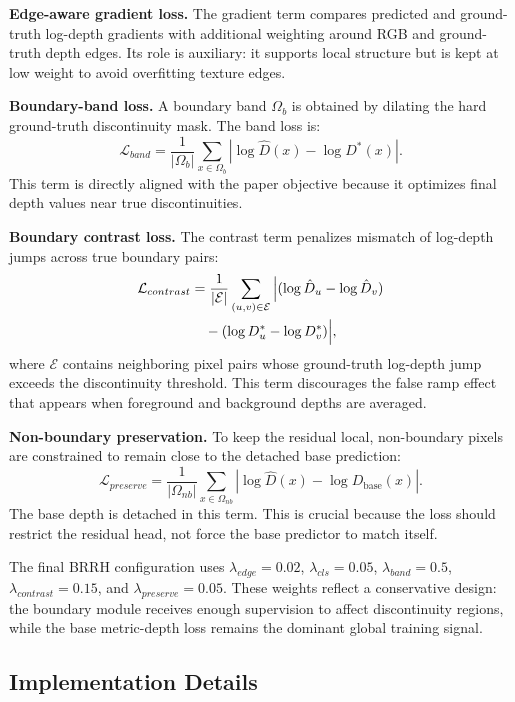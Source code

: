 \documentclass{ieeeaccess}
\begin{document}
\textbf{Edge-aware gradient loss.}
The gradient term compares predicted and ground-truth log-depth gradients with additional weighting around RGB and ground-truth depth edges. Its role is auxiliary: it supports local structure but is kept at low weight to avoid overfitting texture edges.

\textbf{Boundary-band loss.}
A boundary band $\Omega_b$ is obtained by dilating the hard ground-truth discontinuity mask. The band loss is:
\begin{equation}
\mathcal{L}_{band} =
\frac{1}{|\Omega_b|}
\sum_{x\in\Omega_b}
\left|\log \hat{D}(x)-\log D^*(x)\right|.
\label{eq:band}
\end{equation}
This term is directly aligned with the paper objective because it optimizes final depth values near true discontinuities.

\textbf{Boundary contrast loss.}
The contrast term penalizes mismatch of log-depth jumps across true boundary pairs:
\begin{align}
\mathcal{L}_{contrast}
&=
\frac{1}{|\mathcal{E}|}
\sum_{(u,v)\in\mathcal{E}}
\Big|
(\log\hat{D}_u-\log\hat{D}_v) \notag\\
&\quad
-(\log D^*_u-\log D^*_v)
\Big|,
\end{align}
where $\mathcal{E}$ contains neighboring pixel pairs whose ground-truth log-depth jump exceeds the discontinuity threshold. This term discourages the false ramp effect that appears when foreground and background depths are averaged.

\textbf{Non-boundary preservation.}
To keep the residual local, non-boundary pixels are constrained to remain close to the detached base prediction:
\begin{equation}
\mathcal{L}_{preserve} =
\frac{1}{|\Omega_{nb}|}
\sum_{x\in\Omega_{nb}}
\left|\log \hat{D}(x)-\log D_{\mathrm{base}}(x)\right|.
\label{eq:preserve}
\end{equation}
The base depth is detached in this term. This is crucial because the loss should restrict the residual head, not force the base predictor to match itself.

The final BRRH configuration uses $\lambda_{edge}=0.02$, $\lambda_{cls}=0.05$, $\lambda_{band}=0.5$, $\lambda_{contrast}=0.15$, and $\lambda_{preserve}=0.05$. These weights reflect a conservative design: the boundary module receives enough supervision to affect discontinuity regions, while the base metric-depth loss remains the dominant global training signal.

\subsection{Implementation Details}
\end{document}
